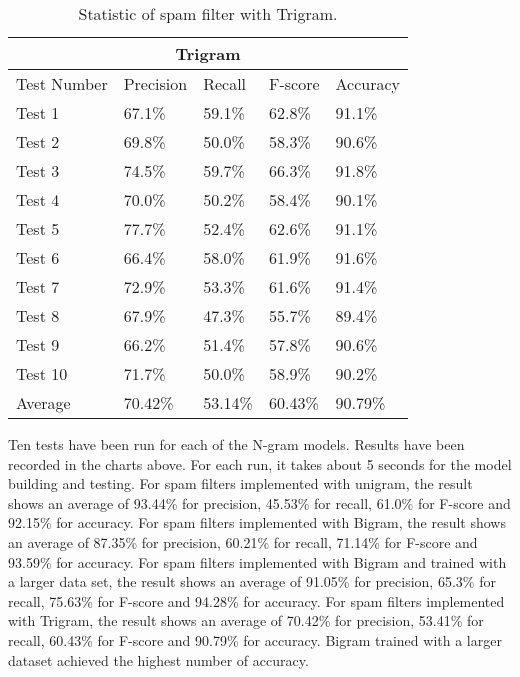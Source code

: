 \documentclass{article}
\begin{document}
\begin{table}[H]
\centering
\begin{tabular}{ |p{2cm}|p{1.1cm}|p{1cm}| p{1.5cm}|p{1.2cm}| }
\hline
\multicolumn{5}{|c|}{Trigram} \\
\hline
Test Number& Precision &Recall &F-score &Accuracy\\
\hline
Test 1 & 67.1\% &59.1\%&62.8\% &  91.1\%\\
Test 2 & 69.8\%   & 50.0\% &58.3\% &90.6\%\\
Test 3 &74.5\% & 59.7\%&66.3\% &91.8\% \\
Test 4 &70.0\% & 50.2\%&58.4\% &90.1\% \\
Test 5 & 77.7\% & 52.4\% &62.6\% &91.1\%\\
Test 6 & 66.4\% & 58.0\% &61.9\% & 91.6\% \\
Test 7 & 72.9\% & 53.3\% &61.6\% &91.4\%\\
Test 8 & 67.9\% & 47.3\% &55.7\% &89.4\%\\
Test 9 & 66.2\% & 51.4\% &57.8\% &90.6\%\\
Test 10 & 71.7\% & 50.0\% &58.9\% &90.2\%\\
\hline
Average & 70.42\% & 53.14\% &60.43\% &90.79\%\\
\hline
\end{tabular}
\caption{Statistic of spam filter with Trigram.}
\end{table}

Ten tests have been run for each of the N-gram models. Results have been recorded in the charts above. For each run, it takes about 5 seconds for the model building and testing. 
For spam filters implemented with unigram, the result shows an average of 93.44\% for precision, 45.53\% for recall, 61.0\% for F-score and 92.15\% for accuracy. For spam filters implemented with Bigram, the result shows an average of 87.35\% for precision, 60.21\% for recall, 71.14\% for F-score and 93.59\% for accuracy. For spam filters implemented with Bigram and trained with a larger data set, the result shows an average of 91.05\% for precision, 65.3\% for recall, 75.63\% for F-score and 94.28\% for accuracy. For spam filters implemented with Trigram, the result shows an average of 70.42\% for precision, 53.41\% for recall, 60.43\% for F-score and 90.79\% for accuracy. Bigram trained with a larger dataset achieved the highest number of accuracy. 
\end{document}
